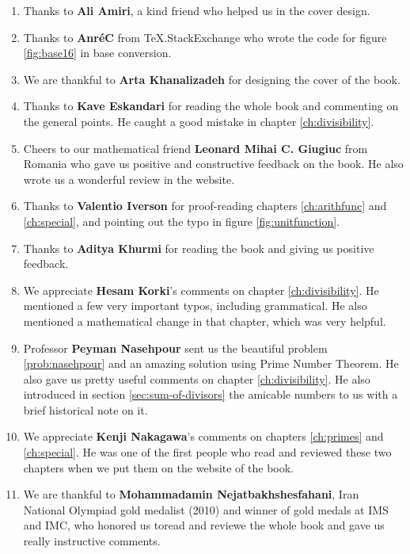 \documentclass[12pt]{book}
\begin{document}
	\begin{enumerate}
		\item Thanks to \textbf{Ali Amiri}, a kind friend who helped us in the cover design. 
		\item Thanks to \textbf{Anr\' eC} from TeX.StackExchange who wrote the code for figure \eqref{fig:base16} in base conversion.
		\item We are thankful to \textbf{Arta Khanalizadeh} for designing the cover of the book.
		\item Thanks to \textbf{Kave Eskandari} for reading the whole book and commenting on the general points. He caught a good mistake in chapter \ref{ch:divisibility}.
		\item Cheers to our mathematical friend \textbf{Leonard Mihai C. Giugiuc} from Romania who gave us positive and constructive feedback on the book. He also wrote us a wonderful review in the website. 

		\item Thanks to \textbf{Valentio Iverson} for proof-reading chapters \ref{ch:arithfunc} and \ref{ch:special}, and pointing out the typo in figure \eqref{fig:unitfunction}.

		\item Thanks to \textbf{Aditya Khurmi} for reading the book and giving us positive feedback.
				
				
		\item We appreciate \textbf{Hesam Korki}'s comments on chapter \ref{ch:divisibility}. He mentioned a few very important typos, including grammatical. He also mentioned a mathematical change in that chapter, which was very helpful.
		
		\item Professor \textbf{Peyman Nasehpour} sent us the beautiful problem \eqref{prob:nasehpour} and an amazing solution using Prime Number Theorem. He also gave us pretty useful comments on chapter \ref{ch:divisibility}. He also introduced in section \eqref{sec:sum-of-divisors} the amicable numbers to us with a brief historical note on it.
		
		\item We appreciate \textbf{Kenji Nakagawa}'s comments on chapters \ref{ch:primes} and \ref{ch:special}. He was one of the first people who read and reviewed these two chapters when we put them on the website of the book. 
		
		\item We are thankful to \textbf{Mohammadamin Nejatbakhshesfahani}, Iran National Olympiad gold medalist (2010) and winner of gold medals at IMS and IMC, who honored us toread and reviewe the whole book and gave us really instructive comments.
				

\end{enumerate}
\end{document}
